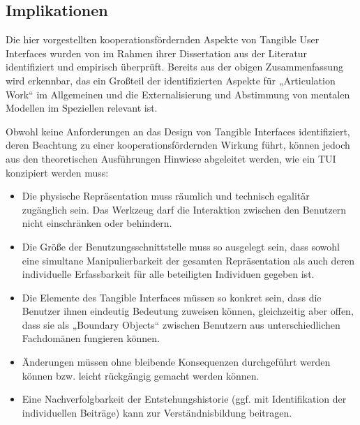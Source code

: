
\subsection{Implikationen} %
\label{sub:tui_koop_fazit}

Die hier vorgestellten kooperationsfördernden Aspekte von Tangible User Interfaces wurden von \citet{Hornecker04} im Rahmen ihrer Dissertation aus der Literatur identifiziert und empirisch überprüft. Bereits aus der obigen Zusammenfassung wird erkennbar, das ein Großteil der identifizierten Aspekte für „Articulation Work“ im Allgemeinen und die Externalisierung und Abstimmung von mentalen Modellen im Speziellen relevant ist.

Obwohl \citet{Hornecker04} keine Anforderungen an das Design von Tangible Interfaces identifiziert, deren Beachtung zu einer kooperationsfördernden Wirkung führt, können jedoch aus den theoretischen Ausführungen Hinwiese abgeleitet werden, wie ein \gls{TUI} konzipiert werden muss:
\begin{itemize}
	\item Die physische Repräsentation muss räumlich und technisch egalitär zugänglich sein. Das Werkzeug darf die Interaktion zwischen den Benutzern nicht einschränken oder behindern.
	\item Die Größe der Benutzungsschnittstelle muss so ausgelegt sein, dass sowohl eine simultane Manipulierbarkeit der gesamten Repräsentation als auch deren individuelle Erfassbarkeit für alle beteiligten Individuen gegeben ist.
	\item Die Elemente des Tangible Interfaces müssen so konkret sein, dass die Benutzer ihnen eindeutig Bedeutung zuweisen können, gleichzeitig aber offen, dass sie als „Boundary Objects“ zwischen Benutzern aus unterschiedlichen Fachdomänen fungieren können.
	\item Änderungen müssen ohne bleibende Konsequenzen durchgeführt werden können bzw. leicht rückgängig gemacht werden können.
	\item Eine Nachverfolgbarkeit der Entstehungshistorie (ggf. mit Identifikation der individuellen Beiträge) kann zur Verständnisbildung beitragen.	
	
\end{itemize}



